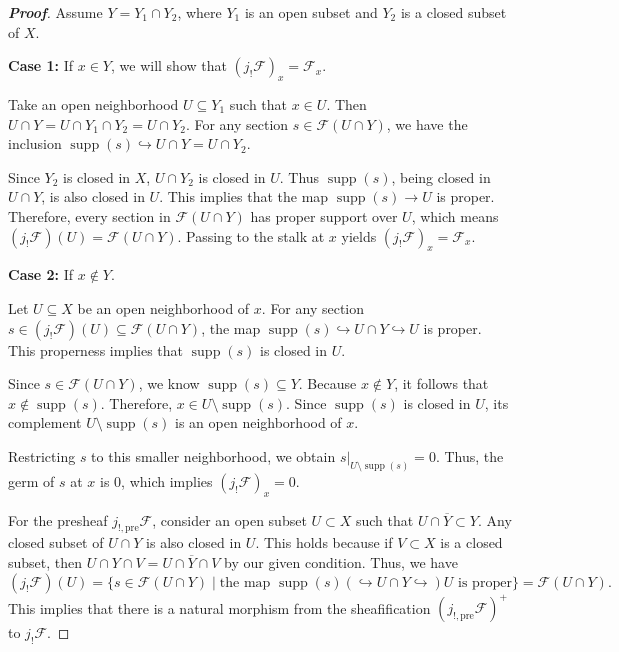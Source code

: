 \begin{proof}[\textbf{Proof}]
Assume $Y = Y_1 \cap Y_2$, where $Y_1$ is an open subset and $Y_2$ is a closed subset of $X$.

\textbf{Case 1:} If $x \in Y$, we will show that $(j_!\mathcal{F})_x = \mathcal{F}_x$. 

Take an open neighborhood $U \subseteq Y_1$ such that $x \in U$. Then $U \cap Y = U \cap Y_1 \cap Y_2 = U \cap Y_2$. For any section $s \in \mathcal{F}(U \cap Y)$, we have the inclusion $\operatorname{supp}(s) \hookrightarrow U \cap Y = U \cap Y_2$. 

Since $Y_2$ is closed in $X$, $U \cap Y_2$ is closed in $U$. Thus $\operatorname{supp}(s)$, being closed in $U \cap Y$, is also closed in $U$. This implies that the map $\operatorname{supp}(s) \to U$ is proper. Therefore, every section in $\mathcal{F}(U \cap Y)$ has proper support over $U$, which means $(j_!\mathcal{F})(U) = \mathcal{F}(U \cap Y)$. Passing to the stalk at $x$ yields $(j_!\mathcal{F})_x = \mathcal{F}_x$.

\textbf{Case 2:} If $x \notin Y$. 

Let $U \subseteq X$ be an open neighborhood of $x$. For any section $s \in (j_!\mathcal{F})(U) \subseteq \mathcal{F}(U \cap Y)$, the map $\operatorname{supp}(s) \hookrightarrow U \cap Y \hookrightarrow U$ is proper. This properness implies that $\operatorname{supp}(s)$ is closed in $U$. 

Since $s \in \mathcal{F}(U \cap Y)$, we know $\operatorname{supp}(s) \subseteq Y$. Because $x \notin Y$, it follows that $x \notin \operatorname{supp}(s)$. Therefore, $x \in U \setminus \operatorname{supp}(s)$. Since $\operatorname{supp}(s)$ is closed in $U$, its complement $U \setminus \operatorname{supp}(s)$ is an open neighborhood of $x$. 

Restricting $s$ to this smaller neighborhood, we obtain $s|_{U \setminus \operatorname{supp}(s)} = 0$. Thus, the germ of $s$ at $x$ is $0$, which implies $(j_!\mathcal{F})_x = 0$.

\bigskip

For the presheaf $j_{!,\text{pre}}\mathcal{F}$, consider an open subset $U \subset X$ such that $U \cap \overline{Y} \subset Y$. Any closed subset of $U \cap Y$ is also closed in $U$. This holds because if $V \subset X$ is a closed subset, then $U \cap Y \cap V = U \cap \overline{Y} \cap V$ by our given condition. Thus, we have
\begin{equation*}
    (j_!\mathcal{F})(U) = \{ s \in \mathcal{F}(U \cap Y) \mid \text{the map } \operatorname{supp}(s) (\hookrightarrow U \cap Y \hookrightarrow) U \text{ is proper} \} = \mathcal{F}(U \cap Y).
\end{equation*}
This implies that there is a natural morphism from the sheafification $(j_{!,\text{pre}}\mathcal{F})^+$ to $j_!\mathcal{F}$.


\end{proof}
